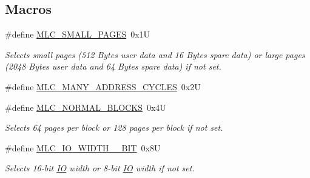 \subsection*{Macros}
\begin{DoxyCompactItemize}
\item 
\#define \mbox{\hyperlink{group__lpc32xx__nand__mlc_ga9e8da612c0810fcabd6d72203134dd65}{M\+L\+C\+\_\+\+S\+M\+A\+L\+L\+\_\+\+P\+A\+G\+ES}}~0x1U
\begin{DoxyCompactList}\small\item\em Selects small pages (512 Bytes user data and 16 Bytes spare data) or large pages (2048 Bytes user data and 64 Bytes spare data) if not set. \end{DoxyCompactList}\item 
\#define \mbox{\hyperlink{group__lpc32xx__nand__mlc_gaa02b2b76bde2195a15a66128a3643517}{M\+L\+C\+\_\+\+M\+A\+N\+Y\+\_\+\+A\+D\+D\+R\+E\+S\+S\+\_\+\+C\+Y\+C\+L\+ES}}~0x2U
\item 
\#define \mbox{\hyperlink{group__lpc32xx__nand__mlc_ga438ea163775acc06c4b1d516aadb1d37}{M\+L\+C\+\_\+\+N\+O\+R\+M\+A\+L\+\_\+\+B\+L\+O\+C\+KS}}~0x4U
\begin{DoxyCompactList}\small\item\em Selects 64 pages per block or 128 pages per block if not set. \end{DoxyCompactList}\item 
\#define \mbox{\hyperlink{group__lpc32xx__nand__mlc_gae60c5844b85dd6758e12d1257b06ce33}{M\+L\+C\+\_\+\+I\+O\+\_\+\+W\+I\+D\+T\+H\+\_\+\_\+\+B\+IT}}~0x8U
\begin{DoxyCompactList}\small\item\em Selects 16-\/bit \mbox{\hyperlink{structIO}{IO}} width or 8-\/bit \mbox{\hyperlink{structIO}{IO}} width if not set. \end{DoxyCompactList}\end{DoxyCompactItemize}
